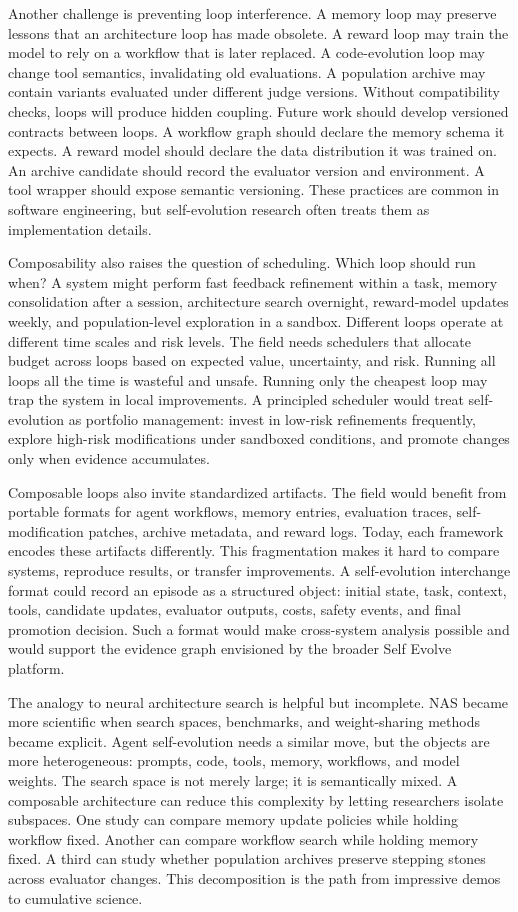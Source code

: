 Another challenge is preventing loop interference. A memory loop may preserve lessons that an architecture loop has made obsolete. A reward loop may train the model to rely on a workflow that is later replaced. A code-evolution loop may change tool semantics, invalidating old evaluations. A population archive may contain variants evaluated under different judge versions. Without compatibility checks, loops will produce hidden coupling. Future work should develop versioned contracts between loops. A workflow graph should declare the memory schema it expects. A reward model should declare the data distribution it was trained on. An archive candidate should record the evaluator version and environment. A tool wrapper should expose semantic versioning. These practices are common in software engineering, but self-evolution research often treats them as implementation details.

Composability also raises the question of scheduling. Which loop should run when? A system might perform fast feedback refinement within a task, memory consolidation after a session, architecture search overnight, reward-model updates weekly, and population-level exploration in a sandbox. Different loops operate at different time scales and risk levels. The field needs schedulers that allocate budget across loops based on expected value, uncertainty, and risk. Running all loops all the time is wasteful and unsafe. Running only the cheapest loop may trap the system in local improvements. A principled scheduler would treat self-evolution as portfolio management: invest in low-risk refinements frequently, explore high-risk modifications under sandboxed conditions, and promote changes only when evidence accumulates.

Composable loops also invite standardized artifacts. The field would benefit from portable formats for agent workflows, memory entries, evaluation traces, self-modification patches, archive metadata, and reward logs. Today, each framework encodes these artifacts differently. This fragmentation makes it hard to compare systems, reproduce results, or transfer improvements. A self-evolution interchange format could record an episode as a structured object: initial state, task, context, tools, candidate updates, evaluator outputs, costs, safety events, and final promotion decision. Such a format would make cross-system analysis possible and would support the evidence graph envisioned by the broader Self Evolve platform.

The analogy to neural architecture search is helpful but incomplete. NAS became more scientific when search spaces, benchmarks, and weight-sharing methods became explicit. Agent self-evolution needs a similar move, but the objects are more heterogeneous: prompts, code, tools, memory, workflows, and model weights. The search space is not merely large; it is semantically mixed. A composable architecture can reduce this complexity by letting researchers isolate subspaces. One study can compare memory update policies while holding workflow fixed. Another can compare workflow search while holding memory fixed. A third can study whether population archives preserve stepping stones across evaluator changes. This decomposition is the path from impressive demos to cumulative science.

